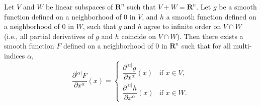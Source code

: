 Let $V$ and $W$ be linear subspaces of $\mathbf{R}^n$ such that $V + W = \mathbf{R}^n$. Let $g$ be a smooth function defined on a neighborhood of $0$ in $V$, and $h$ a smooth function defined on a neighborhood of $0$ in $W$, such that $g$ and $h$ agree to infinite order on $V \cap W$ (i.e., all partial derivatives of $g$ and $h$ coincide on $V \cap W$). Then there exists a smooth function $F$ defined on a neighborhood of $0$ in $\mathbf{R}^n$ such that for all multi-indices $\alpha$,
$$\frac{\partial^{|\alpha|} F}{\partial x^\alpha}(x) = \begin{cases}
\dfrac{\partial^{|\alpha|} g}{\partial x^\alpha}(x) & \text{if } x \in V,\\[8pt]
\dfrac{\partial^{|\alpha|} h}{\partial x^\alpha}(x) & \text{if } x \in W.
\end{cases}$$

